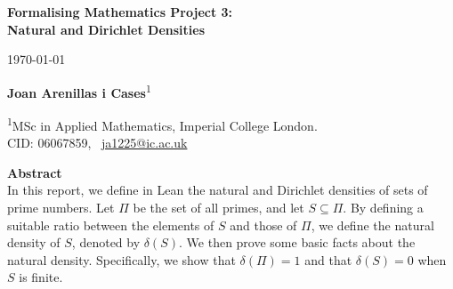 \documentclass[a4paper,11pt]{article}
\theoremstyle{plain}
\newcommand{\R}{\ensuremath{\mathbb{R}}} %
\begin{document}
	\sffamily
	
	\begin{center}
		{\LARGE\bfseries
			Formalising Mathematics Project 3: \\[0.3em]
			Natural and Dirichlet Densities \\[0.3em]
			\par}
        \vspace{0.45cm}
        {\large \today\par}
	\end{center}
    
	\vspace{0.2cm}
	
	\begin{center}
		\textbf{Joan Arenillas i Cases}\textsuperscript{1}
	\end{center}
	
	\vspace{0.5cm}
	
	\noindent
	\textsuperscript{1}MSc in Applied Mathematics, Imperial College London.\\
	CID: 06067859, \ \href{mailto:ja1225@ic.ac.uk}{ja1225@ic.ac.uk}
	
	\vspace{0.6cm}
	
	\vspace{0.5cm}
	
	\noindent
	\textbf{Abstract}\\
    
    In this report, we define in Lean the natural and Dirichlet densities of sets of prime numbers. Let $\Pi$ be the set of all primes, and let $S\subseteq\Pi$. By defining a suitable ratio between the elements of $S$ and those of $\Pi$, we define the natural density of $S$, denoted by $\delta(S)$. We then prove some basic facts about the natural density. Specifically, we show that $\delta(\Pi)=1$ and that $\delta(S)=0$ when $S$ is finite. 
    
\end{document}
